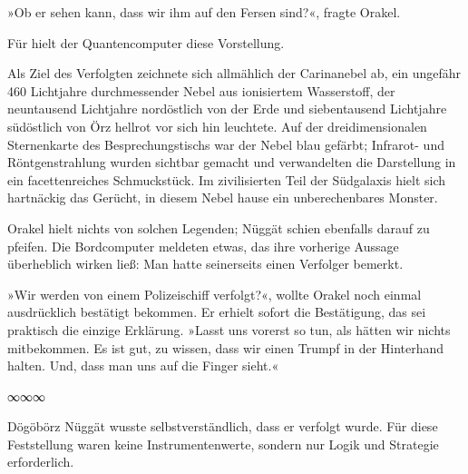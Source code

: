 »Ob er sehen kann, dass wir ihm auf den Fersen sind?«, fragte Orakel.

Für  hielt der Quantencomputer diese Vorstellung. 

Als Ziel des Verfolgten zeichnete sich allmählich der Carinanebel ab, ein ungefähr 460 Lichtjahre durchmessender Nebel aus ionisiertem Wasserstoff, der neuntausend Lichtjahre nordöstlich von der Erde und siebentausend Lichtjahre südöstlich von Örz hellrot vor sich hin leuchtete. Auf der dreidimensionalen Sternenkarte des Besprechungstischs war der Nebel blau gefärbt; Infrarot- und Röntgenstrahlung wurden sichtbar gemacht und verwandelten die Darstellung in ein facettenreiches Schmuckstück. Im zivilisierten Teil der Südgalaxis hielt sich hartnäckig das Gerücht, in diesem Nebel hause ein unberechenbares Monster.

Orakel hielt nichts von solchen Legenden; Nüggät schien ebenfalls darauf zu pfeifen. Die Bordcomputer meldeten etwas, das ihre vorherige Aussage überheblich wirken ließ: Man hatte seinerseits einen Verfolger bemerkt.


»Wir werden von einem Polizeischiff verfolgt?«, wollte Orakel noch einmal ausdrücklich bestätigt bekommen. Er erhielt sofort die Bestätigung, das sei praktisch die einzige Erklärung. »Lasst uns vorerst so tun, als hätten wir nichts mitbekommen. Es ist gut, zu wissen, dass wir einen Trumpf in der Hinterhand halten. Und, dass man uns auf die Finger sieht.«

\begin{center}
∞∞∞
\end{center}

Dögöbörz Nüggät wusste selbstverständlich, dass er verfolgt wurde. Für diese Feststellung waren keine Instrumentenwerte, sondern nur Logik und Strategie erforderlich.

